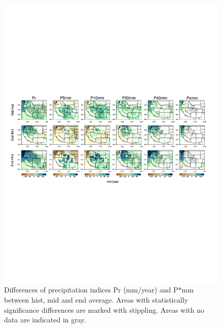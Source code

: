 \documentclass{ametsoc}
\begin{document}
\begin{figure}
\begin{center}
\includegraphics[width=8in, trim={0.6cm 9.5cm 1.0cm 9.0cm},clip]{wd_index_all_years_part2.pdf}
\caption{Differences of precipitation indices Pr (mm/year) and P$\ast$mm between \textsf{hist}, \textsf{mid} and \textsf{end} average.  Areas with statistically significance differences are marked with stippling. Areas with no data are indicated in gray.}
\label{fig:difIndex2}
\end{center}
\end{figure}
\end{document}
